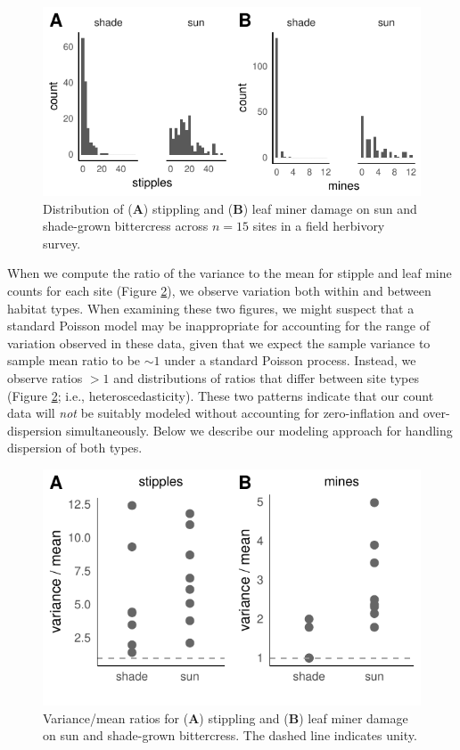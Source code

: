 \documentclass[11pt, oneside]{amsart}
\begin{document}
\begin{figure}[h]
\begin{center}
\includegraphics[scale = 0.9]{A3_figS1}
\caption{Distribution of (\textbf{A}) stippling and (\textbf{B}) leaf miner damage on sun and shade-grown bittercress across $n=15$ sites in a field herbivory survey.}
\label{fig:one}
\end{center}
\end{figure}

When we compute the ratio of the variance to the mean for stipple and leaf mine counts for each site (Figure \ref{fig:two}), we observe variation both within and between habitat types. When examining these two figures, we might suspect that a standard Poisson model may be inappropriate for accounting for the range of variation observed in these data, given that we expect the sample variance to sample mean ratio to be $\sim 1$ under a standard Poisson process. Instead, we observe ratios $>1$ and distributions of ratios that differ between site types (Figure \ref{fig:two}; i.e., heteroscedasticity). These two patterns indicate that our count data will \emph{not} be suitably modeled without accounting for zero-inflation and over-dispersion simultaneously. Below we describe our modeling approach for handling dispersion of both types.

\begin{figure}[!th]
\begin{center}
\includegraphics[scale = 0.9]{A3_figS2}
\caption{Variance/mean ratios for (\textbf{A}) stippling and (\textbf{B}) leaf miner damage on sun and shade-grown bittercress. The dashed line indicates unity.}
\label{fig:two}
\end{center}
\end{figure}
\end{document}
